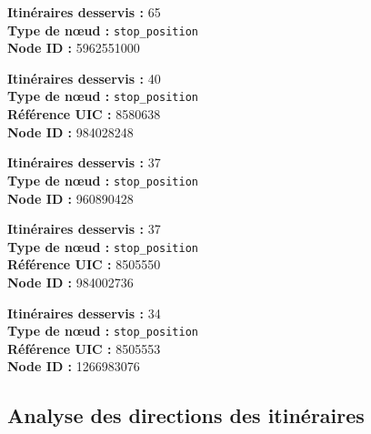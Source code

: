 \begin{tcolorbox}[colback=gray!10, colframe=brown, title=\textbf{1er} — Zürich Bus Station, fontupper=\normalsize\bfseries]
\textbf{Itinéraires desservis :} 65 \\
\textbf{Type de nœud :} \texttt{stop\_position} \\
\textbf{Node ID :} 5962551000
\end{tcolorbox}

\begin{tcolorbox}[colback=gray!10, colframe=brown, title=\textbf{2e} — Stein, fontupper=\normalsize\bfseries]
\textbf{Itinéraires desservis :} 40 \\
\textbf{Type de nœud :} \texttt{stop\_position} \\
\textbf{Référence UIC :} 8580638 \\
\textbf{Node ID :} 984028248
\end{tcolorbox}

\begin{tcolorbox}[colback=gray!10, colframe=brown, title=\textbf{3e} — Genève - Gare Routière, fontupper=\normalsize\bfseries]
\textbf{Itinéraires desservis :} 37 \\
\textbf{Type de nœud :} \texttt{stop\_position} \\
\textbf{Node ID :} 960890428
\end{tcolorbox}

\begin{tcolorbox}[colback=gray!10, colframe=brown, title=\textbf{4e} — Lugano Centrale, fontupper=\normalsize\bfseries]
\textbf{Itinéraires desservis :} 37 \\
\textbf{Type de nœud :} \texttt{stop\_position} \\
\textbf{Référence UIC :} 8505550 \\
\textbf{Node ID :} 984002736
\end{tcolorbox}

\begin{tcolorbox}[colback=gray!10, colframe=brown, title=\textbf{5e} — Paradiso, fontupper=\normalsize\bfseries]
\textbf{Itinéraires desservis :} 34 \\
\textbf{Type de nœud :} \texttt{stop\_position} \\
\textbf{Référence UIC :} 8505553 \\
\textbf{Node ID :} 1266983076
\end{tcolorbox}

\subsection{Analyse des directions des itinéraires}

